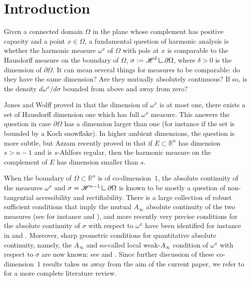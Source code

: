 \documentclass[JEP,XML,SOM,Unicode,published]{cedram}
\numberwithin{equation}{section}
\theoremstyle{plain}
\theoremstyle{definition}
\newcommand{\R}{\mathbb{R}}
\newcommand{\R}{\mathbb{R}}
\newcommand{\mres}{\mathbin{\vrule height 1.6ex depth 0pt width
0.13ex\vrule height 0.13ex depth 0pt width 1.3ex}}
\begin{document}
\maketitle

\tableofcontents


\section{Introduction}\label{S1}
Given a connected domain $\Omega$ in the plane whose complement has positive capacity and a point $x\in \Omega$, a fundamental question of harmonic analysis is whether the harmonic measure $\omega^x$ of $\Omega$ with pole at $x$ is comparable to the Hausdorff measure on the boundary of $\Omega$, $\sigma:= \mathscr{H}^\delta \mres \partial \Omega$, where $\delta>0$ is the dimension of $\partial \Omega$. It can mean several things for measures to be comparable: do they have the same dimension? Are they mutually absolutely continuous? If so, is the density $d\omega^x/d \sigma$ bounded from above and away from zero?

Jones and Wolff proved in \cite{JonesWolff}
that the dimension of $\omega^x$ is at most one, \ie there exists a set of Hausdorff dimension one which has
full $\omega^x$ measure. This answers the question in case $\partial \Omega$ has a
dimension larger than one (for instance if the set is bounded by a Koch snowflake).
In higher ambient dimensions, the question is more subtle, but Azzam recently proved in \cite{Azzam2020} that if $E\subset \R^n$ has dimension $s>n-1$ and is $s$-Ahlfors regular, then the harmonic measure on the complement of $E$ has dimension smaller than $s$.

When the boundary of $\Omega \subset \R^n$ is of co-dimension~$1$,
the absolute continuity of the measures $\omega^x$ and
$\sigma = \mathscr{H}^{n-1} \mres \partial \Omega$ is known to be mostly
a question of non-tangential accessibility and rectifiability. There is a large collection of robust sufficient conditions
that imply the mutual $A_\infty$ absolute continuity of the two measures (see for instance \cite{Dah} and \cite{DJ}), and more recently very precise conditions for the absolute continuity of $\sigma$ with respect to $\omega^x$ have been identified for instance in \cite{AHMMMTV2016GAFA} and \cite{ABHM19}. Moreover, sharp geometric conditions for quantitative absolute continuity, namely, the $A_\infty$ and so-called local weak-$A_\infty$ condition of $\omega^x$ with respect to $\sigma$ are now known: see \cite{Azzam2021} and \cite{AHMMT2020Inventiones}. Since further discussion of these co-dimension~$1$ results takes us away from the aim of the current paper, we refer to \cite{AHMMMTV2016GAFA} for a more complete literature review.\enlargethispage{-\baselineskip}
\end{document}
